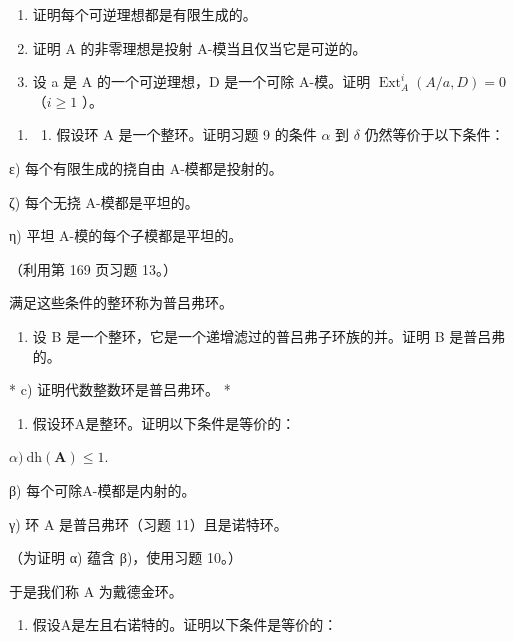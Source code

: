 \begin{enumerate}
\def\labelenumi{\alph{enumi})}
\item
  证明每个可逆理想都是有限生成的。
\item
  证明 A 的非零理想是投射 A-模当且仅当它是可逆的。
\item
  设 a 是 A 的一个可逆理想，D 是一个可除 A-模。证明 \(\operatorname{Ext}_A^i(A/a, D) = 0\) （\(i \geqslant 1\) ）。
\end{enumerate}

\begin{enumerate}
\def\labelenumi{\arabic{enumi})}
\setcounter{enumi}{10}
\tightlist
\item
  \begin{enumerate}
  \def\labelenumii{\alph{enumii})}
  \tightlist
  \item
    假设环 A 是一个整环。证明习题 9 的条件 \(\alpha\) 到 \(\delta\) 仍然等价于以下条件：
  \end{enumerate}
\end{enumerate}

ε) 每个有限生成的挠自由 A-模都是投射的。

ζ) 每个无挠 A-模都是平坦的。

η) 平坦 A-模的每个子模都是平坦的。

（利用第 169 页习题 13。）

满足这些条件的整环称为普吕弗环。

\begin{enumerate}
\def\labelenumi{\alph{enumi})}
\setcounter{enumi}{1}
\tightlist
\item
  设 B 是一个整环，它是一个递增滤过的普吕弗子环族的并。证明 B 是普吕弗的。
\end{enumerate}

* c) 证明代数整数环是普吕弗环。 *

\begin{enumerate}
\def\labelenumi{\arabic{enumi})}
\setcounter{enumi}{11}
\tightlist
\item
  假设环A是整环。证明以下条件是等价的：
\end{enumerate}

\(\alpha)\ \mathrm{dh}(\mathbf{A}) \leqslant 1.\)

β) 每个可除A-模都是内射的。

γ) 环 A 是普吕弗环（习题 11）且是诺特环。

（为证明 α) 蕴含 β)，使用习题 10。）

于是我们称 A 为戴德金环。

\begin{enumerate}
\def\labelenumi{\arabic{enumi})}
\setcounter{enumi}{12}
\tightlist
\item
  假设A是左且右诺特的。证明以下条件是等价的：
\end{enumerate}

